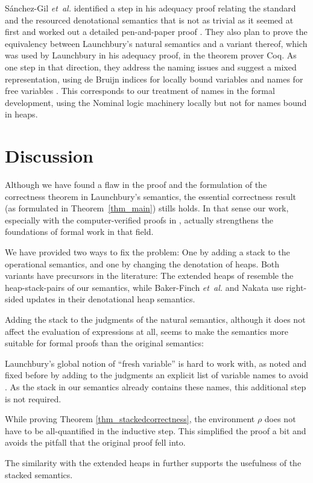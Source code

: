 \documentclass{jfp1}
\theoremstyle{nonumberbreak}
\begin{document}
S{\'a}nchez-Gil {\em et~al.} identified a step in his adequacy proof relating the standard and the resourced denotational semantics that is not as trivial as it seemed at first and worked out a detailed pen-and-paper proof . They also plan to prove the equivalency between Launchbury’s natural semantics and a variant thereof, which was used by Launchbury in his adequacy proof, in the theorem prover Coq. As one step in that direction, they address the naming issues and suggest a mixed representation, using de Bruijn indices for locally bound variables and names for free variables . This corresponds to our treatment of names in the formal development, using the Nominal logic machinery \cite{nominal} locally but not for names bound in heaps.

\section{Discussion}

Although we have found a flaw in the proof and the formulation of the correctness theorem in Launchbury’s semantics, the essential correctness result (as formulated in Theorem~\ref{thm_main}) stills holds. In that sense our work, especially with the computer-verified proofs in \cite{afp}, actually strengthens the foundations of formal work in that field.

We have provided two ways to fix the problem: One by adding a stack to the operational semantics, and one by changing the denotation of heaps. Both variants have precursors in the literature: The extended heaps of \cite{distributed} resemble the heap-stack-pairs of our semantics, while Baker-Finch {\em et~al.}  and Nakata  use right-sided updates in their denotational heap semantics.

Adding the stack to the judgments of the natural semantics, although it does not affect the evaluation of expressions at all, seems to make the semantics more suitable for formal proofs than the original semantics:
\begin{compactitem}
\item Launchbury’s global notion of “fresh variable” is hard to work with, as noted and fixed before by adding to the judgments an explicit list of variable names to avoid \cite{sestoft}. As the stack in our semantics already contains these names, this additional step is not required.
\item While proving Theorem \ref{thm_stackedcorrectness}, the environment $\rho$ does not have to be all-quantified in the inductive step. This simplified the proof a bit and avoids the pitfall that the original proof fell into.
\end{compactitem}
The similarity with the extended heaps in \cite{distributed} further supports the usefulness of the stacked semantics.
\end{document}
